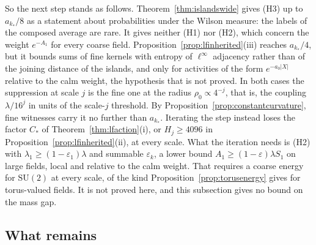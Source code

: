 \documentclass[11pt]{amsart}
\theoremstyle{definition}
\theoremstyle{remark}
\numberwithin{equation}{section}
\newcommand{\SU}{\mathrm{SU}}
\begin{document}
So the next step stands as follows.
Theorem~\ref{thm:islandswide} gives (H3) up to $a_{k_*}/8$ as a statement
about probabilities under the Wilson measure: the labels of the composed
average are rare. It gives neither (H1) nor (H2), which concern the
weight $e^{-A_1}$ for every coarse field. Proposition~\ref{prop:lfinherited}(iii)
reaches $a_{k_*}/4$, but it bounds sums of fine kernels with entropy of
$\ell^\infty$ adjacency rather than of the joining distance of the islands,
and only for activities of the form $e^{-a_0|X|}$ relative to the calm
weight, the hypothesis that is not proved. In both cases the suppression at
scale $j$ is the fine one at the radius $\rho_0\propto4^{-j}$, that is, the
coupling $\lambda/16^{j}$ in units of the scale-$j$ threshold. By
Proposition~\ref{prop:constantcurvature}, fine witnesses carry it no further
than $a_{k_*}$. Iterating the step instead loses the factor $C_*$ of
Theorem~\ref{thm:lfaction}(i), or $H_j\ge4096$ in
Proposition~\ref{prop:lfinherited}(ii), at every scale. What the iteration
needs is (H2) with $\lambda_1\ge(1-\varepsilon_1)\lambda$ and summable
$\varepsilon_k$, a lower bound $A_1\ge(1-\varepsilon)\lambda S_1$ on large
fields, local and relative to the calm weight. That requires a coarse
energy for $\SU(2)$ at every scale, of the kind
Proposition~\ref{prop:torusenergy} gives for torus-valued fields. It is not
proved here, and this subsection gives no bound on the mass gap.

\subsection{What remains}\label{ssec:remains}
\end{document}
